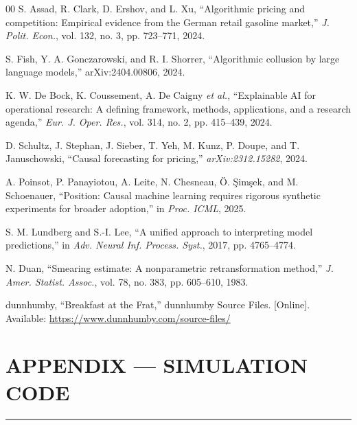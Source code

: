 \documentclass[conference,a4paper]{IEEEtran}
\newif\ifincludecode
\begin{document}
\begin{thebibliography}{00}
 S. Assad, R. Clark, D. Ershov, and L. Xu, ``Algorithmic
pricing and competition: Empirical evidence from the German retail gasoline
market,'' \emph{J. Polit. Econ.}, vol. 132, no. 3,
pp. 723--771, 2024.

 S. Fish, Y. A. Gonczarowski, and R. I. Shorrer,
``Algorithmic collusion by large language models,'' arXiv:2404.00806, 2024.

 K. W. De Bock, K. Coussement, A. De Caigny \emph{et al.},
``Explainable AI for operational research: A defining framework, methods,
applications, and a research agenda,'' \emph{Eur. J. Oper. Res.}, vol. 314, no. 2, pp. 415--439, 2024.

 D. Schultz, J. Stephan, J. Sieber, T. Yeh, M. Kunz,
P. Doupe, and T. Januschowski, ``Causal forecasting for pricing,''
\emph{arXiv:2312.15282}, 2024.

 A. Poinsot, P. Panayiotou, A. Leite, N. Chesneau,
\"{O}. \c{S}im\c{s}ek, and M. Schoenauer, ``Position: Causal machine learning
requires rigorous synthetic experiments for broader adoption,'' in
\emph{Proc. ICML}, 2025.

 S. M. Lundberg and S.-I. Lee, ``A unified approach to
interpreting model predictions,'' in \emph{Adv. Neural Inf. Process. Syst.}, 2017, pp. 4765--4774.

 N. Duan, ``Smearing estimate: A nonparametric
retransformation method,'' \emph{J. Amer. Statist. Assoc.}, vol. 78, no. 383,
pp. 605--610, 1983.

 dunnhumby, ``Breakfast at the Frat,'' dunnhumby Source
Files. [Online]. Available: \url{https://www.dunnhumby.com/source-files/}

\end{thebibliography}

\balance

\ifincludecode

\clearpage
\onecolumn
\appendices
\section*{APPENDIX --- SIMULATION CODE}

\noindent\rule{\textwidth}{0.8pt}\vspace{1mm}
\end{document}
